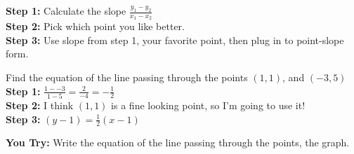 \documentclass[12pt]{article}
\begin{document}
\textbf{Step 1:} Calculate the slope $\frac{y_1-y_2}{x_1-x_2}$\\

\textbf{Step 2:} Pick which point you like better.\\

\textbf{Step 3:} Use slope from step 1, your favorite point, then plug  in to point-slope form.\\

\hrulefill


Find the equation of the line passing through the points $(1,1)$, and $(-3,5)$\\

\textbf{Step 1:} $\frac{1- -3}{1-5}=\frac{2}{-4}=-\frac{1}{2}$\\

\textbf{Step 2:} I think $(1,1)$ is a fine looking point, so I'm going to use it!\\

\textbf{Step 3:} $(y-1)=\frac{1}{2}(x-1)$\\

\hrulefill

\textbf{You Try:} Write the equation of the line passing through the points, the graph. 
\end{document}

